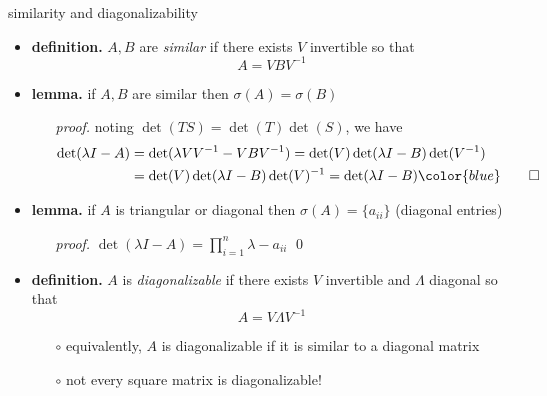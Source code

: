 \documentclass[10pt,hyperref]{beamer}
\newcommand{\bqed}{{\color{blue}\qed}}
\begin{document}
\begin{frame}{similarity and diagonalizability}

\begin{itemize}
\item \textbf{definition.} $A,B$ are \emph{similar} if there exists $V$ invertible so that
    $$A = V B V^{-1}$$
\item \textbf{lemma.} if $A,B$ are similar then $\sigma(A)=\sigma(B)$
    \begin{itemize}
    \item[\emph{proof.}] noting $\det(TS)=\det(T)\det(S)$, we have
\begin{align*}
\det(\lambda I - A) &= \det(\lambda VV^{-1} - V B V^{-1}) = \det(V) \det(\lambda I - B) \det(V^{-1}) \\
    &= \det(V) \det(\lambda I - B) \det(V)^{-1} = \det(\lambda I - B) \bqed
\end{align*}
    \end{itemize}
\item \textbf{lemma.} if $A$ is triangular or diagonal then $\sigma(A)=\{a_{ii}\}$  (diagonal entries)
    \begin{itemize}
    \item[\emph{proof.}] $\det(\lambda I - A) = \prod_{i=1}^n \lambda-a_{ii}$ \bqed
    \end{itemize}
\item \textbf{definition.} $A$ is \emph{diagonalizable} if there exists $V$ invertible and $\Lambda$ diagonal so that
    $$A = V \Lambda V^{-1}$$

    \begin{itemize}
    \item[$\circ$] equivalently, $A$ is diagonalizable if it is similar to a diagonal matrix
    \item[$\circ$] not every square matrix is diagonalizable!
    \end{itemize}
\end{itemize}
\end{frame}
\end{document}
